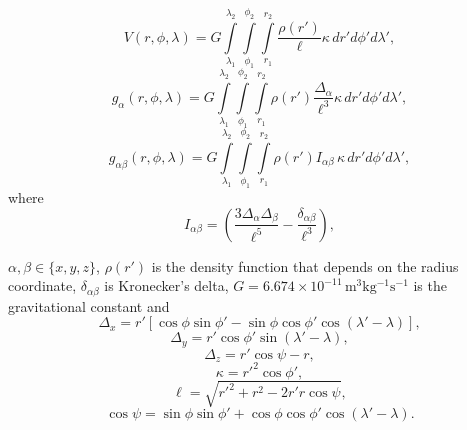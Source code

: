 \documentclass[extra]{gji}
\begin{document}
\begin{equation}
    V(r,\phi,\lambda) = G
    \int\limits_{\lambda_1}^{\lambda_2}
    \int\limits_{\phi_1}^{\phi_2}
    \int\limits_{r_1}^{r_2}
    \frac{\rho(r')}{\ell} \kappa \,  dr' d\phi' d\lambda',
\label{eq:tesseroid-pot}
\end{equation}
\begin{equation}
    g_{\alpha}(r,\phi,\lambda) = G
    \int\limits_{\lambda_1}^{\lambda_2}
    \int\limits_{\phi_1}^{\phi_2}
    \int\limits_{r_1}^{r_2}
    \rho(r') \frac{\Delta_\alpha}{\ell^3}
    \kappa \, dr' d\phi' d\lambda',
\label{eq:tesseroid-grav}
\end{equation}
\begin{equation}
    g_{\alpha\beta}(r,\phi,\lambda) = G
    \int\limits_{\lambda_1}^{\lambda_2}
    \int\limits_{\phi_1}^{\phi_2}
    \int\limits_{r_1}^{r_2}
    \rho(r') I_{\alpha\beta} \, \kappa \, dr' d\phi' d\lambda' ,
    \label{eq:tesseroid-tensor}
\end{equation}
\noindent where
\begin{equation}
    I_{\alpha\beta} =
    \left(
        \frac{3\Delta_{\alpha} \Delta_{\beta}}{\ell^5} -
        \frac{\delta_{\alpha\beta}}{\ell^3}
    \right) ,
    \label{eq:tesseroid-tensor-kernel}
\end{equation}

\noindent $\alpha, \beta \in \{x, y, z\}$,
$\rho(r')$ is the density function that depends on the radius coordinate,
$\delta_{\alpha\beta}$ is Kronecker's delta,
$G = 6.674\times10^{-11}\, \text{m$^3$kg$^{-1}$s$^{-1}$}$ is the gravitational constant and
\begin{equation}
    \Delta_x = r'[\cos\phi\sin\phi' - \sin\phi\cos\phi'
               \cos(\lambda' - \lambda)],
\end{equation}
\begin{equation}
    \Delta_y = r' \cos \phi' \sin(\lambda' - \lambda),
\end{equation}
\begin{equation}
    \Delta_z = r' \cos \psi - r,
\end{equation}
\begin{equation}
    \kappa = {r'}^2 \cos \phi',
\end{equation}
\begin{equation}
    \ell = \sqrt{{r'}^2 + r^2 - 2 r' r \cos \psi},
\end{equation}
\begin{equation}
    \cos\psi = \sin\phi\sin\phi' + \cos\phi\cos\phi'
                 \cos(\lambda' - \lambda).
\end{equation}
\end{document}

